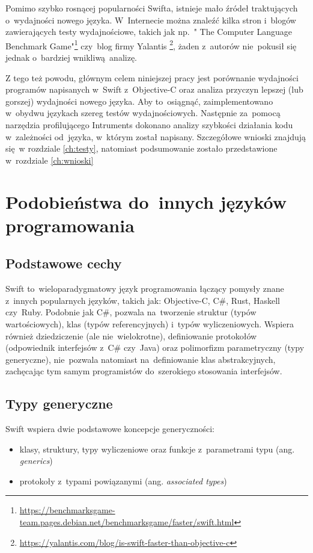 \documentclass[mgr, shortabstract]{iithesis}
\begin{document}
Pomimo szybko rosnącej popularności Swifta, istnieje mało źródeł traktujących o~wydajności nowego języka. W~Internecie można znaleźć kilka stron i~blogów zawierających testy wydajnościowe, takich jak np.~" The Computer Language Benchmark Game"\footnote{\url{https://benchmarksgame-team.pages.debian.net/benchmarksgame/faster/swift.html}} czy~blog firmy Yalantis \footnote{\url{https://yalantis.com/blog/is-swift-faster-than-objective-c}}, żaden z~autorów nie~pokusił się jednak o~bardziej wnikliwą analizę. 

Z tego też powodu, głównym celem niniejszej pracy jest porównanie wydajności programów napisanych w~Swift z~Objective-C oraz analiza przyczyn lepszej (lub gorszej) wydajności nowego języka. Aby to~osiągnąć, zaimplementowano w~obydwu językach szereg testów wydajnościowych. Następnie za~pomocą narzędzia profilującego Intruments dokonano analizy szybkości działania kodu w~zależności od~języka, w~którym został napisany. Szczegółowe wnioski znajdują się w rozdziale \ref{ch:testy}, natomiast podsumowanie zostało przedstawione w~rozdziale \ref{ch:wnioski}

\chapter{Podobieństwa do~innych języków programowania}
\label{ch:podobienstwa_do_innych}

\section{Podstawowe cechy}
\label{s:podstawowe_cechy}

Swift to~wieloparadygmatowy język programowania łączący pomysły znane z~innych popularnych języków, takich jak: Objective-C, C\#, Rust, Haskell czy~Ruby. Podobnie jak C\#, pozwala na~tworzenie struktur (typów wartościowych), klas (typów referencyjnych) i~typów wyliczeniowych. Wspiera również dziedziczenie (ale nie~wielokrotne), definiowanie protokołów (odpowiednik interfejsów z~C\# czy~Java) oraz polimorfizm parametryczny (typy generyczne), nie~pozwala natomiast na~definiowanie klas abstrakcyjnych, zachęcając tym samym programistów do~szerokiego stosowania interfejsów.

\section{Typy generyczne}
\label{s:typy_generyczne}

Swift wspiera dwie podstawowe koncepcje generyczności:
\begin{itemize}
  \item klasy, struktury, typy wyliczeniowe oraz funkcje z~parametrami typu (ang. \textit{generics})
  \item protokoły z~typami powiązanymi (ang. \textit{associated types})
\end{itemize}
\end{document}
